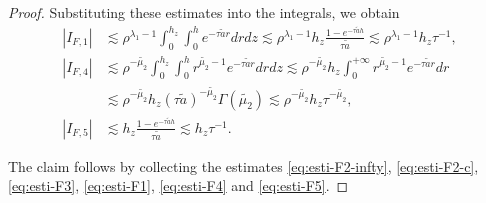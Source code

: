 ﻿\documentclass[11pt,reqno,oneside]{amsart}
\theoremstyle{definition}
\theoremstyle{remark}
\newcommand{\lm}{\lambda}
\begin{document}
\begin{proof}
            Substituting these estimates into the integrals, we obtain
            \begin{align}
                |I_{F,1}| &\lesssim \rho^{\lm_1-1} \int_0^{h_z}\int_0^h e^{-\tau\widetilde{a} r} dr dz \lesssim \rho^{\lm_1-1}h_z \frac{1-e^{-\tau\widetilde{a} h}}{\tau \widetilde{a}} \lesssim \rho^{\lm_1-1}h_z \tau^{-1} ,\label{eq:esti-F1}\\
                |I_{F,4}| &\lesssim \rho^{-\widetilde{\mu_2}} \int_0^{h_z}\int_0^h r^{\widetilde{\mu_2}-1} e^{-\tau\widetilde{a} r} dr dz\lesssim \rho^{-\widetilde{\mu_2}} h_z \int_0^{+\infty} r^{\widetilde{\mu_2}-1} e^{-\tau\widetilde{a} r} dr  \nonumber \\
                &\lesssim \rho^{-\widetilde{\mu_2}}h_z (\tau\widetilde{a})^{-\widetilde{\mu_2}}\Gamma(\widetilde{\mu_2})\lesssim \rho^{-\widetilde{\mu_2}}h_z \tau^{-\widetilde{\mu_2}},\label{eq:esti-F4}\\
                |I_{F,5}| &\lesssim h_z \frac{1-e^{-\tau\widetilde{a} h}}{\tau \widetilde{a}} \lesssim h_z \tau^{-1}.\label{eq:esti-F5}
            \end{align}

            The claim follows by collecting the estimates \eqref{eq:esti-F2-infty}, \eqref{eq:esti-F2-c}, \eqref{eq:esti-F3}, \eqref{eq:esti-F1}, \eqref{eq:esti-F4} and \eqref{eq:esti-F5}.
        \end{proof}

        \medskip
\end{document}
